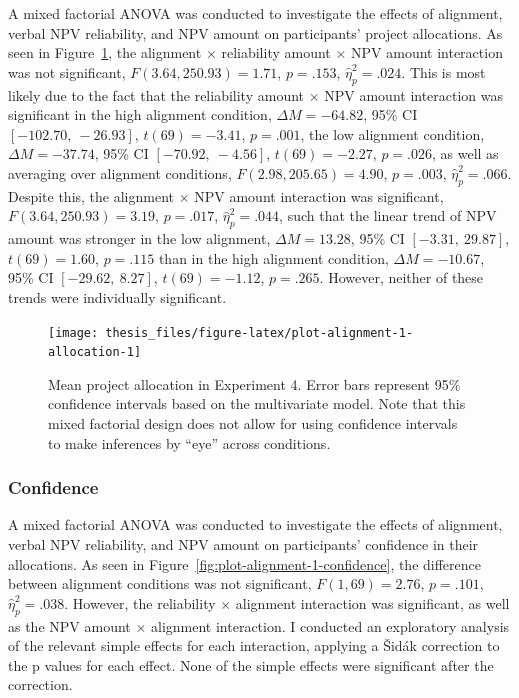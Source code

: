 \documentclass[a4paper, nobind, dvipsnames]{templates/ociamthesis}
\theoremstyle{definition}
\theoremstyle{definition}
\theoremstyle{definition}
\theoremstyle{definition}
\theoremstyle{remark}
\begin{document}
A mixed factorial ANOVA was conducted to investigate the effects of alignment,
verbal NPV reliability, and NPV amount on participants' project allocations. As
seen in Figure~\ref{fig:plot-alignment-1-allocation}, the alignment \(\times\)
reliability amount \(\times\) NPV amount interaction was not significant,
\(F(3.64, 250.93) = 1.71\), \(p = .153\), \(\hat{\eta}^2_p = .024\). This
is most likely due to the fact that the reliability amount \(\times\) NPV amount
interaction was significant in the high alignment condition,
\(\Delta M = -64.82\), 95\% CI \([-102.70,~-26.93]\), \(t(69) = -3.41\), \(p = .001\), the low alignment
condition, \(\Delta M = -37.74\), 95\% CI \([-70.92,~-4.56]\), \(t(69) = -2.27\), \(p = .026\), as well as
averaging over alignment conditions,
\(F(2.98, 205.65) = 4.90\), \(p = .003\), \(\hat{\eta}^2_p = .066\). Despite this,
the alignment \(\times\) NPV amount interaction was significant,
\(F(3.64, 250.93) = 3.19\), \(p = .017\), \(\hat{\eta}^2_p = .044\), such that the linear
trend of NPV amount was stronger in the low alignment,
\(\Delta M = 13.28\), 95\% CI \([-3.31,~29.87]\), \(t(69) = 1.60\), \(p = .115\) than in the high alignment
condition, \(\Delta M = -10.67\), 95\% CI \([-29.62,~8.27]\), \(t(69) = -1.12\), \(p = .265\). However, neither of
these trends were individually significant.



\begin{figure}
\texttt{[image: thesis\_files/figure-latex/plot-alignment-1-allocation-1]} \caption{Mean project allocation in Experiment 4. Error bars represent 95\% confidence intervals based on the multivariate model. Note that this mixed factorial design does not allow for using confidence intervals to make inferences by ``eye'' across conditions.}\label{fig:plot-alignment-1-allocation}
\end{figure}

\subsubsection{Confidence}

A mixed factorial ANOVA was conducted to investigate the effects of alignment,
verbal NPV reliability, and NPV amount on participants' confidence in their
allocations. As seen in Figure~\ref{fig:plot-alignment-1-confidence}, the
difference between alignment conditions was not significant,
\(F(1, 69) = 2.76\), \(p = .101\), \(\hat{\eta}^2_p = .038\). However, the reliability \(\times\)
alignment interaction was significant, as well as the NPV amount \(\times\)
alignment interaction. I conducted an exploratory analysis of the relevant
simple effects for each interaction, applying a Šidák correction to the p values
for each effect. None of the simple effects were significant after the
correction.
\end{document}
